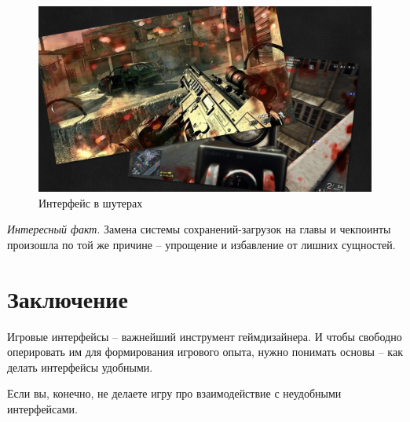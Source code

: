 \documentclass{article}
\begin{document}
\begin{figure}[H]
  \includegraphics[width=\textwidth]{res/img/shooter.png}
  \caption{Интерфейс в шутерах}
\end{figure}

\textit{Интересный факт}. Замена системы сохранений-загрузок на главы и чекпоинты произошла по той же причине -- упрощение и избавление от лишних сущностей.

\section*{Заключение}
Игровые интерфейсы -- важнейший инструмент геймдизайнера. И чтобы свободно оперировать им для формирования игрового опыта, нужно понимать основы -- как делать интерфейсы удобными.

Если вы, конечно, не делаете игру про взаимодействие с неудобными интерфейсами.
\end{document}
